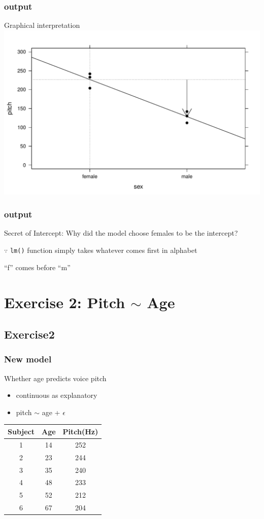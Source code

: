 \documentclass[10p]{beamer}\usepackage[]{graphicx}\usepackage[]{color}
\makeatletter
\def\maxwidth{ %
  \ifdim\Gin@nat@width>\linewidth
    \linewidth
  \else
    \Gin@nat@width
  \fi
}
\newenvironment{knitrout}{}{} %
\makeatother
\begin{document}
\begin{frame}[fragile]
\frametitle{output}
Graphical interpretation
\begin{knitrout}
\color{fgcolor}
\includegraphics[width=\maxwidth]{figure/unnamed-chunk-9-1} 

\end{knitrout}
\end{frame}
\begin{frame}
\frametitle{output}
Secret of Intercept: Why did the model choose females to be the intercept?
\pause

\vspace{9pt}
$\because$ \texttt{lm()} function simply takes whatever comes first in \alert{alphabet} 

``f'' comes before ``m''

\end{frame}

\section[Exercise2]{Exercise 2: Pitch $\sim$ Age}
\subsection[Ex2]{Exercise2}

\begin{frame}[fragile]
\frametitle{New model}
Whether age predicts voice pitch
\begin{itemize}
\item continuous as explanatory 
\item pitch $\sim$ age + $\epsilon$
\end{itemize}
\begin{center}
\begin{tabular}{ccc}
\toprule
Subject & Age & Pitch(Hz) \\
\midrule
1 & 14 & 252 \\
2 & 23 & 244 \\
3 & 35 & 240 \\
4 & 48 & 233 \\
5 & 52 & 212 \\
6 & 67 & 204 \\
\bottomrule
\end{tabular}
\end{center}
\end{frame}
\end{document}
